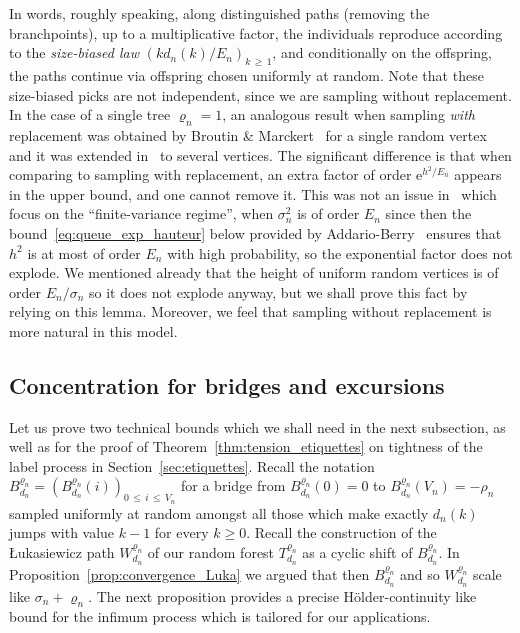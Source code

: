 \documentclass[AHL,Unicode,longabstracts,published]{cedram}
\newcommand{\1}{\ensembles{1}}
\renewcommand{\le}{\leqslant}
\renewcommand{\ge}{\geqslant}
\newcommand{\e}{\mathrm{e}}
\newcommand{\fn}{T_{d_n}^{\varrho_n}}
\newcommand{\Wfn}{W_{d_n}^{\varrho_n}}
\newcommand{\Bfn}{B_{d_n}^{\varrho_n}}
\newcommand{\edges}{E}
\newcommand{\vertices}{V}
\begin{document}
In words, roughly speaking, along distinguished paths (removing the branchpoints), up to a multiplicative factor, the individuals reproduce according to the \emph{size-biased law} $(kd_n(k)/\edges_n)_{k\,\ge\,1}$, and conditionally on the offspring, the paths continue via offspring chosen uniformly at random. Note that these size-biased picks are not independent, since we are sampling without replacement. In the case of a single tree $\varrho_n = 1$, an analogous result when sampling \emph{with} replacement was obtained by Broutin \& Marckert~\cite{BM14} for a single random vertex and it was extended in~\cite{Mar18b} to several vertices. The significant difference is that when comparing to sampling with replacement, an extra factor of order $\e^{h^2/\edges_n}$ appears in the upper bound, and one cannot remove it. This was not an issue in~\cite{BM14, Mar18b} which focus on the ``finite-variance regime'', when $\sigma_n^2$ is of order $\edges_n$ since then the bound~\eqref{eq:queue_exp_hauteur} below provided by Addario-Berry~\cite{AB12} ensures that $h^2$ is at most of order $\edges_n$ with high probability, so the exponential factor does not explode. We mentioned already that the height of uniform random vertices is of order $\edges_n / \sigma_n$ so it does not explode anyway, but we shall prove this fact by relying on this lemma. Moreover, we feel that sampling without replacement is more natural in this model.



\subsection{Concentration for bridges and excursions}\label{sec:Luka}

Let us prove two technical bounds which we shall need in the next subsection, as well as for the proof of Theorem~\ref{thm:tension_etiquettes} on tightness of the label process in Section~\ref{sec:etiquettes}. Recall the notation $\Bfn = (\Bfn(i))_{0\,\le\,i\,\le\, \vertices_n}$ for a bridge from $\Bfn(0) = 0$ to $\Bfn(\vertices_n) = -\rho_n$ sampled uniformly at random amongst all those which make exactly $d_n(k)$ jumps with value $k-1$ for every $k \ge 0$. Recall the construction of the {\L}ukasiewicz path $\Wfn$ of our random forest $\fn$ as a cyclic shift of $\Bfn$. In Proposition~\ref{prop:convergence_Luka} we argued that then $\Bfn$ and so $\Wfn$ scale like $\sigma_n+\varrho_n$. The next proposition provides a precise Hölder-continuity like bound for the infimum process which is tailored for our applications.
\end{document}
